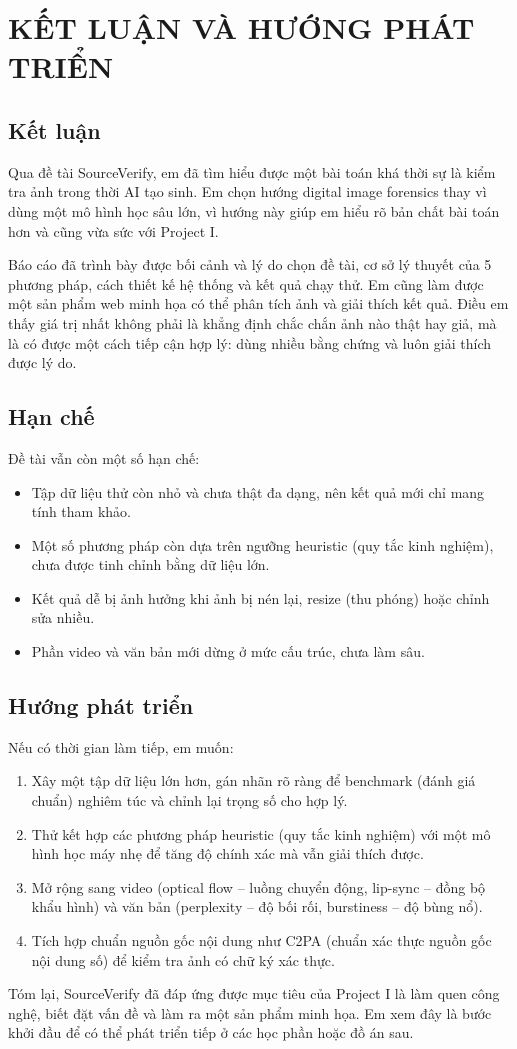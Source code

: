 \chapter{KẾT LUẬN VÀ HƯỚNG PHÁT TRIỂN}

\section{Kết luận}
Qua đề tài SourceVerify, em đã tìm hiểu được một bài toán khá thời sự là kiểm tra ảnh trong thời AI tạo sinh. Em chọn hướng digital image forensics thay vì dùng một mô hình học sâu lớn, vì hướng này giúp em hiểu rõ bản chất bài toán hơn và cũng vừa sức với Project I.

Báo cáo đã trình bày được bối cảnh và lý do chọn đề tài, cơ sở lý thuyết của 5 phương pháp, cách thiết kế hệ thống và kết quả chạy thử. Em cũng làm được một sản phẩm web minh họa có thể phân tích ảnh và giải thích kết quả. Điều em thấy giá trị nhất không phải là khẳng định chắc chắn ảnh nào thật hay giả, mà là có được một cách tiếp cận hợp lý: dùng nhiều bằng chứng và luôn giải thích được lý do.

\section{Hạn chế}
Đề tài vẫn còn một số hạn chế:
\begin{itemize}
  \item Tập dữ liệu thử còn nhỏ và chưa thật đa dạng, nên kết quả mới chỉ mang tính tham khảo.
  \item Một số phương pháp còn dựa trên ngưỡng heuristic (quy tắc kinh nghiệm), chưa được tinh chỉnh bằng dữ liệu lớn.
  \item Kết quả dễ bị ảnh hưởng khi ảnh bị nén lại, resize (thu phóng) hoặc chỉnh sửa nhiều.
  \item Phần video và văn bản mới dừng ở mức cấu trúc, chưa làm sâu.
\end{itemize}

\section{Hướng phát triển}
Nếu có thời gian làm tiếp, em muốn:
\begin{enumerate}
  \item Xây một tập dữ liệu lớn hơn, gán nhãn rõ ràng để benchmark (đánh giá chuẩn) nghiêm túc và chỉnh lại trọng số cho hợp lý.
  \item Thử kết hợp các phương pháp heuristic (quy tắc kinh nghiệm) với một mô hình học máy nhẹ để tăng độ chính xác mà vẫn giải thích được.
  \item Mở rộng sang video (optical flow -- luồng chuyển động, lip-sync -- đồng bộ khẩu hình) và văn bản (perplexity -- độ bối rối, burstiness -- độ bùng nổ).
  \item Tích hợp chuẩn nguồn gốc nội dung như C2PA (chuẩn xác thực nguồn gốc nội dung số) để kiểm tra ảnh có chữ ký xác thực.
\end{enumerate}

Tóm lại, SourceVerify đã đáp ứng được mục tiêu của Project I là làm quen công nghệ, biết đặt vấn đề và làm ra một sản phẩm minh họa. Em xem đây là bước khởi đầu để có thể phát triển tiếp ở các học phần hoặc đồ án sau.
